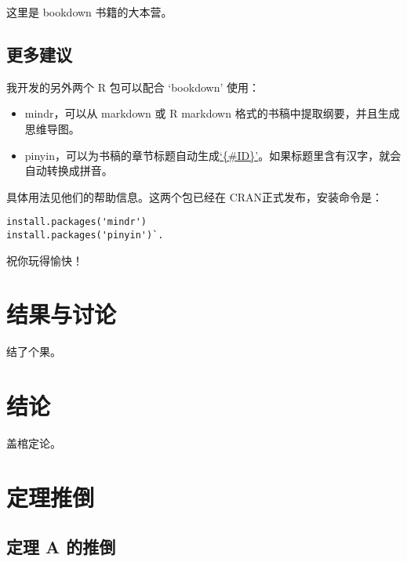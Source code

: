 \documentclass[doublesided]{Style/ucasthesis}%
\begin{document}
这里是 bookdown 书籍的大本营。

\hypertarget{section-8}{%
\section{更多建议}\label{section-8}}

我开发的另外两个 R 包可以配合 `bookdown' 使用：

\begin{itemize}
\item
  mindr，可以从 markdown 或 R markdown 格式的书稿中提取纲要，并且生成思维导图。
\item
  pinyin，可以为书稿的章节标题自动生成\href{https://bookdown.org/yihui/bookdown/cross-references.html}{`\{\#ID\}'}。如果标题里含有汉字，就会自动转换成拼音。
\end{itemize}

具体用法见他们的帮助信息。这两个包已经在 CRAN正式发布，安装命令是：

\begin{verbatim}
install.packages('mindr')
install.packages('pinyin')`.
\end{verbatim}

祝你玩得愉快！

\hypertarget{results}{%
\chapter{结果与讨论}\label{results}}

结了个果。

\hypertarget{conclusion}{%
\chapter{结论}\label{conclusion}}

盖棺定论。

\appendix

\hypertarget{section-9}{%
\chapter{定理推倒}\label{section-9}}

\raggedbottom

\hypertarget{a-}{%
\section{定理 A 的推倒}\label{a-}}

\flushbottom

\backmatter
\end{document}
